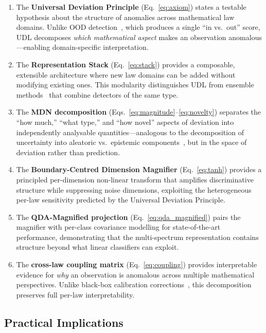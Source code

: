 \documentclass[journal]{IEEEtran}
\begin{document}
\begin{enumerate}
  \item The \textbf{Universal Deviation Principle} (Eq.~\eqref{eq:axiom}) states a testable hypothesis about the structure of anomalies across mathematical law domains. Unlike OOD detection~\cite{hendrycks2017baseline,liang2018odin,liu2020energy}, which produces a single ``in vs.\ out'' score, UDL decomposes \textit{which mathematical aspect} makes an observation anomalous---enabling domain-specific interpretation.
  \item The \textbf{Representation Stack} (Eq.~\eqref{eq:stack}) provides a composable, extensible architecture where new law domains can be added without modifying existing ones. This modularity distinguishes UDL from ensemble methods~\cite{lazarevic2005feature} that combine detectors of the same type.
  \item The \textbf{MDN decomposition} (Eqs.~\eqref{eq:magnitude}--\eqref{eq:novelty}) separates the ``how much,'' ``what type,'' and ``how novel'' aspects of deviation into independently analysable quantities---analogous to the decomposition of uncertainty into aleatoric vs.\ epistemic components~\cite{lakshminarayanan2017ensembles}, but in the space of deviation rather than prediction.
  \item The \textbf{Boundary-Centred Dimension Magnifier} (Eq.~\eqref{eq:tanh}) provides a principled per-dimension non-linear transform that amplifies discriminative structure while suppressing noise dimensions, exploiting the heterogeneous per-law sensitivity predicted by the Universal Deviation Principle.
  \item The \textbf{QDA-Magnified projection} (Eq.~\eqref{eq:qda_magnified}) pairs the magnifier with per-class covariance modelling for state-of-the-art performance, demonstrating that the multi-spectrum representation contains structure beyond what linear classifiers can exploit.
  \item The \textbf{cross-law coupling matrix} (Eq.~\eqref{eq:coupling}) provides interpretable evidence for \textit{why} an observation is anomalous across multiple mathematical perspectives. Unlike black-box calibration corrections~\cite{guo2017calibration}, this decomposition preserves full per-law interpretability.
\end{enumerate}

\subsection{Practical Implications}
\end{document}
